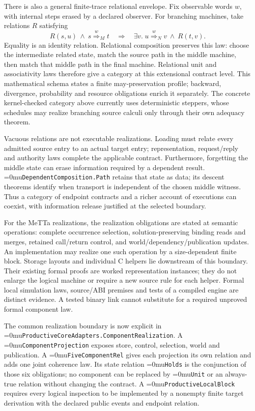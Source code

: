 \documentclass[11pt,a4paper]{article}
\newcommand{\name}[1]{\textup{\Urlmuskip=0mu\relax\nolinkurl{#1}}}
\begin{document}
There is also a general finite-trace relational envelope. Fix observable
words $w$, with internal steps erased by a declared observer. For branching
machines, take relations $R$ satisfying
\[
 R(s,u)\ \wedge\ s\overset{w}{\Longrightarrow}_M t
 \quad\Longrightarrow\quad
 \exists v.\;u\overset{w}{\Longrightarrow}_N v\ \wedge\ R(t,v).
\]
Equality is an identity relation. Relational composition preserves this law:
choose the intermediate related state, match the source path in the middle
machine, then match that middle path in the final machine. Relational unit
and associativity laws therefore give a category at this extensional contract
level. This mathematical schema states a finite may-preservation profile;
backward, divergence, probability and resource obligations enrich it separately.
The concrete kernel-checked category above currently uses deterministic
steppers, whose schedules may realize branching source calculi only through
their own adequacy theorem.

Vacuous relations are not executable realizations. Loading must relate every
admitted source entry to an actual target entry; representation, request/reply
and authority laws complete the applicable contract. Furthermore, forgetting
the middle state can erase information required by a dependent result.
\name{DependentComposition.Path} retains that state as data; its descent
theorems identify when transport is independent of the chosen middle witness.
Thus a category of endpoint contracts and a richer account of executions can
coexist, with information release justified at the selected boundary.

For the MeTTa realizations, the realization obligations are stated at semantic
operations: complete occurrence selection, solution-preserving binding reads
and merges, retained call/return control, and world/dependency/publication
updates. An implementation may realize one such operation by a size-dependent
finite block. Storage layouts and individual C helpers lie downstream of this
boundary. Their existing formal proofs are worked representation instances;
they do not enlarge the logical machine or require a new source rule for
each helper. Formal local simulation laws, source/ABI premises and tests of a
compiled engine are distinct evidence. A tested binary link cannot substitute
for a required unproved formal component law.

The common realization boundary is now explicit in
\name{ProductiveCoreAdapters.ComponentRealization}.  A
\name{ComponentProjection} exposes store, control, selection, world and
publication.  A \name{FiveComponentRel} gives each projection its own
relation and adds one joint coherence law.  Its state relation
\name{Holds} is the conjunction of those six obligations; no component can be
replaced by \name{Unit} or an always-true relation without changing the
contract.  A \name{ProductiveLocalBlock} requires every logical inspection to
be implemented by a nonempty finite target derivation with the declared public
events and endpoint relation.
\end{document}
